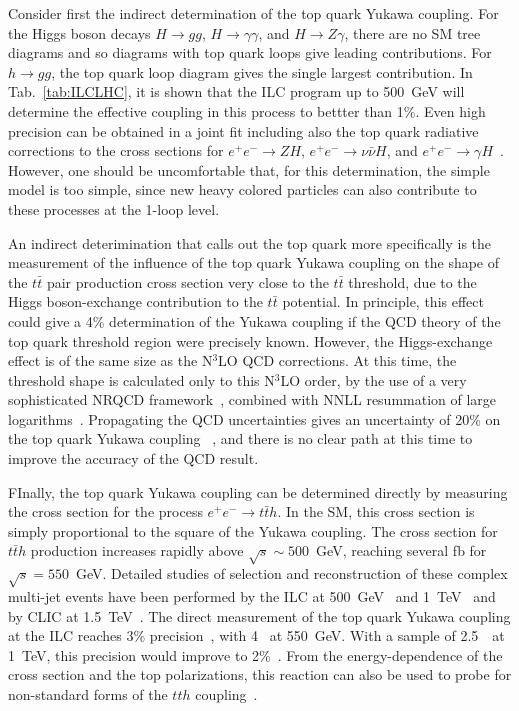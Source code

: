 Consider first the indirect determination of the top quark Yukawa coupling.
   For the Higgs boson decays
$H\to gg$, $H\to \gamma\gamma$, and $H\to Z \gamma$, there are no SM tree
diagrams
and so diagrams with top quark loops give leading contributions.  For
$h\to gg$, the top quark loop diagram gives the single largest
contribution.   In Tab.~\ref{tab:ILCLHC}, it is shown that the ILC
program up to 
500~GeV will determine the effective coupling in this process to bettter
than 1\%.    Even high precision can be obtained in a joint fit
including also the top quark radiative corrections to the cross
sections for $e^+e^- \rightarrow ZH$, $e^+e^- \rightarrow \nu\bar\nu
H$, and $e^+e^- \to  \gamma H$~\cite{Boselli:2018zxr}.   However, one
should be uncomfortable that, for this determination, the simple model is
too simple, since new heavy colored particles can also contribute to
these processes at the 1-loop level.

An indirect deterimination that calls out the top quark more
specifically is the measurement of the influence of the top quark
Yukawa coupling on the shape of the  $t\bar{t}$ pair production 
cross section very close to the $t\bar{t}$ threshold, due to the Higgs
boson-exchange contribution to the $t\bar t$ potential. In principle,
this effect could give a 4\% determination of the Yukawa coupling if
the QCD  theory of the top quark threshold region were precisely
known.   However, the Higgs-exchange effect is of the same size as
the N$^3$LO QCD corrections.  At this time, the threshold shape is
calculated only to this N$^3$LO order, by the use of a very sophisticated
NRQCD framework~\cite{Beneke:2015kwa}, combined with NNLL resummation of
large logarithms~\cite{Hoang:2013uda}.   Propagating the QCD
uncertainties gives an uncertainty of 20\% on the top quark Yukawa
coupling~\cite{Vos:2016til} , and there is no clear path at this time to improve the
accuracy of the QCD result.

 FInally, the top quark Yukawa coupling can be determined directly by
 measuring the cross section for the process
$e^+e^- \rightarrow t\bar{t}h$.  In the SM, this cross section is simply
proportional to the square of the Yukawa coupling.   The cross 
section for $t\bar{t}h$ production increases rapidly above $\sqrt{s} \sim 500 $~GeV,
reaching several fb for $\sqrt{s} = 550$~GeV. Detailed studies of
selection
 and reconstruction of these complex multi-jet events
have been performed by the ILC at 500~GeV~\cite{Yonamine:2011jg} and
 1~TeV~\cite{Behnke:2013lya,Price:2014oca} and by CLIC
at 1.5~TeV~\cite{Abramowicz:2018rjq}. The direct measurement of the
top
 quark Yukawa coupling at the ILC reaches 3\%
precision~\cite{Fujii:2015jha}, with 4~\iab{} at 550~GeV.  With a sample of
2.5~\iab\  at 
1~TeV, this precision would improve to 2\%~\cite{Asner:2013psa}.  From
the energy-dependence of the cross section and the top polarizations,
this reaction can also be used to probe for non-standard forms of the
$tth$ coupling~\cite{Han:1999xd}.

